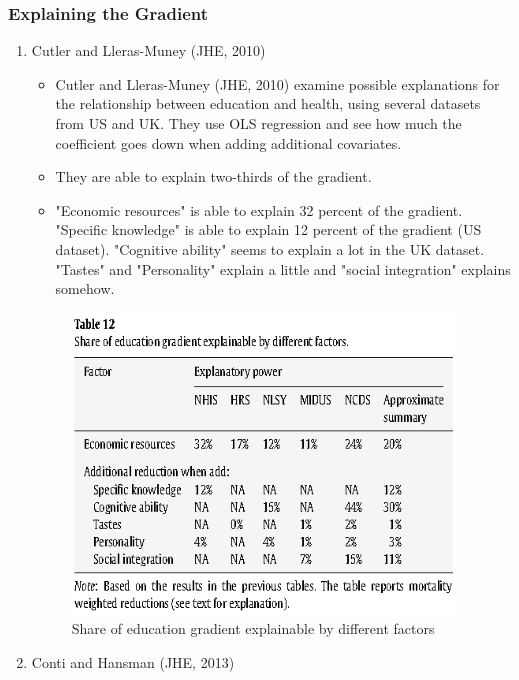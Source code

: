 \subsubsection{Explaining the Gradient}
\begin{enumerate}
    \item Cutler and Lleras-Muney (JHE, 2010)

\begin{itemize}

        \item Cutler and Lleras-Muney (JHE, 2010) examine possible explanations for the relationship between education and health, using several datasets from US and UK. They use OLS regression and see how much the coefficient goes down when adding additional covariates.
        \item They are able to explain two-thirds of the gradient.
        \item "Economic resources" is able to explain 32 percent of the gradient. "Specific knowledge" is able to explain 12 percent of the gradient (US dataset). "Cognitive ability" seems to explain a lot in the UK dataset. "Tastes" and "Personality" explain a little and "social integration" explains somehow.
\end{itemize}
        
\begin{figure}[H]%
                \centering
                \includegraphics[width=4in]{images/ch3/41.png}
                \caption{Share of education gradient explainable by different factors}
                \label{fig:label}
            \end{figure}
            
\item Conti and Hansman (JHE, 2013)
            

\end{enumerate}
